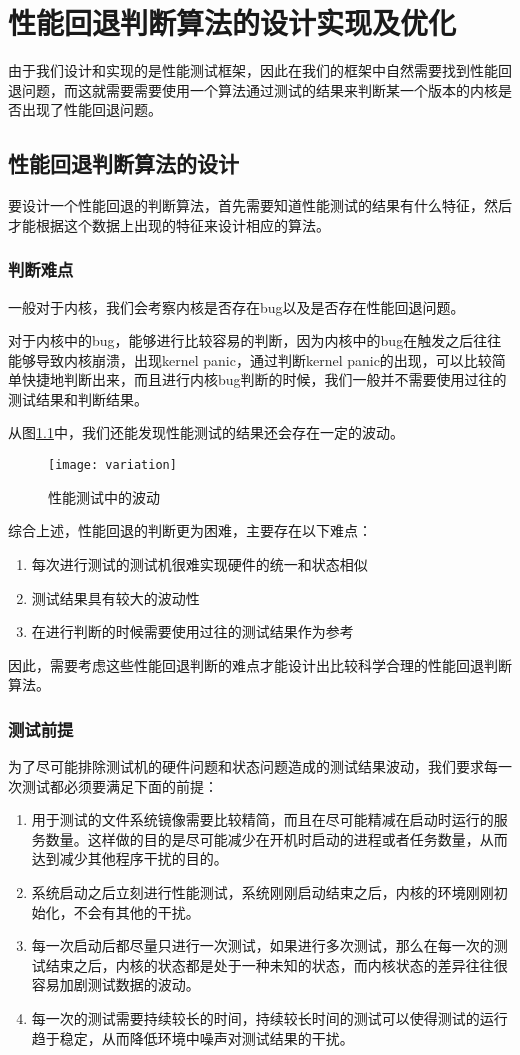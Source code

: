

\chapter{性能回退判断算法的设计实现及优化}
由于我们设计和实现的是性能测试框架，因此在我们的框架中自然需要找到性能回退问题，而这就需要需要使用一个算法通过测试的结果来判断某一个版本的内核是否出现了性能回退问题。


\section{性能回退判断算法的设计}
要设计一个性能回退的判断算法，首先需要知道性能测试的结果有什么特征，然后才能根据这个数据上出现的特征来设计相应的算法。

\subsection{判断难点}
一般对于内核，我们会考察内核是否存在bug以及是否存在性能回退问题。

对于内核中的bug，能够进行比较容易的判断，因为内核中的bug在触发之后往往能够导致内核崩溃，出现kernel panic，通过判断kernel panic的出现，可以比较简单快捷地判断出来，而且进行内核bug判断的时候，我们一般并不需要使用过往的测试结果和判断结果。

从图\ref{fig:variation}中，我们还能发现性能测试的结果还会存在一定的波动。
\begin{figure}[H]
\centering
\texttt{[image: variation]}
\caption{性能测试中的波动\cite{chen2007keeping}}
\label{fig:variation}
\end{figure}

综合上述，性能回退的判断更为困难，主要存在以下难点：
\begin{enumerate}
\item 每次进行测试的测试机很难实现硬件的统一和状态相似
\item 测试结果具有较大的波动性
\item 在进行判断的时候需要使用过往的测试结果作为参考
\end{enumerate}

因此，需要考虑这些性能回退判断的难点才能设计出比较科学合理的性能回退判断算法。
\subsection{测试前提}
为了尽可能排除测试机的硬件问题和状态问题造成的测试结果波动，我们要求每一次测试都必须要满足下面的前提：
\begin{enumerate}
\item 用于测试的文件系统镜像需要比较精简，而且在尽可能精减在启动时运行的服务数量。这样做的目的是尽可能减少在开机时启动的进程或者任务数量，从而达到减少其他程序干扰的目的。
\item 系统启动之后立刻进行性能测试，系统刚刚启动结束之后，内核的环境刚刚初始化，不会有其他的干扰。
\item 每一次启动后都尽量只进行一次测试，如果进行多次测试，那么在每一次的测试结束之后，内核的状态都是处于一种未知的状态，而内核状态的差异往往很容易加剧测试数据的波动。
\item 每一次的测试需要持续较长的时间，持续较长时间的测试可以使得测试的运行趋于稳定，从而降低环境中噪声对测试结果的干扰。
\end{enumerate}
